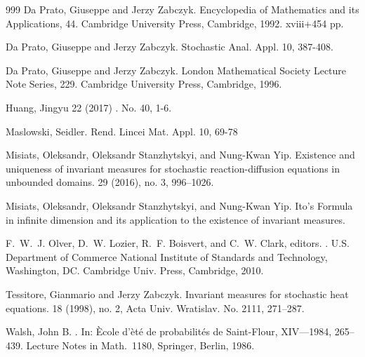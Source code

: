 \documentclass[a4paper,11pt]{article}%
\numberwithin{equation}{section}
\theoremstyle{plain}
\theoremstyle{definition}
\begin{document}
\begin{small}
\begin{thebibliography}{999}
		Da Prato, Giuseppe and Jerzy Zabczyk.
		Encyclopedia of Mathematics and its Applications, 44. Cambridge University Press, Cambridge, 1992. xviii+454 pp.

		Da Prato, Giuseppe and Jerzy Zabczyk.
		Stochastic Anal. Appl. 10, 387-408.


		Da Prato, Giuseppe and Jerzy Zabczyk.
		\newblock London Mathematical Society Lecture Note Series, 229. Cambridge University Press, Cambridge, 1996.

		Huang, Jingyu
		 22 (2017) . No. 40, 1-6.

		Maslowski, Seidler.
		\newblock Rend. Lincei Mat. Appl. 10, 69-78

		Misiats, Oleksandr, Oleksandr Stanzhytskyi, and Nung-Kwan Yip.
		\newblock Existence and uniqueness of invariant measures for stochastic reaction-diffusion equations in unbounded domains.
		 29 (2016), no. 3, 996--1026.


		Misiats, Oleksandr, Oleksandr Stanzhytskyi, and Nung-Kwan Yip.
		\newblock Ito's Formula in infinite dimension and its application to the existence of invariant measures.

		F.~W.~J. Olver, D.~W. Lozier, R.~F. Boisvert, and C.~W. Clark, editors.
		.
		\newblock U.S. Department of Commerce National Institute of Standards  and Technology, Washington, DC. Cambridge Univ. Press, Cambridge, 2010.

		Tessitore, Gianmario and Jerzy Zabczyk.
		\newblock Invariant measures for stochastic heat equations.
		 18 (1998), no. 2, Acta Univ. Wratislav. No. 2111, 271--287.

		 Walsh, John B.
		.
		\newblock In: \`Ecole d'\`et\'e de probabilit\'es de
		Saint-Flour, XIV---1984, 265--439.
		Lecture Notes in Math.\ 1180, Springer, Berlin, 1986.

	\end{thebibliography}
\end{small}
\end{document}
